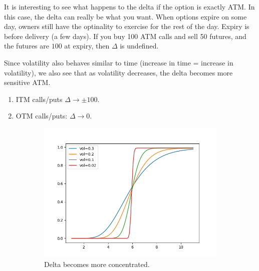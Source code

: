\documentclass{article}
\begin{document}
    It is interesting to see what happens to the delta if the option is exactly ATM. In this case, the delta can really be what you want. When options expire on some day, owners still have the optinality to exercise for the rest of the day. Expiry is before delivery (a few days). If you buy 100 ATM calls and sell 50 futures, and the futures are $100$ at expiry, then $\Delta$ is undefined.

    \begin{theorem}
      Since volatility also behaves similar to time (increase in time = increase in volatility), we also see that as volatility decreases, the delta becomes more sensitive ATM.  
      \begin{enumerate}
        \item ITM calls/puts $\Delta \rightarrow \pm 100$. 
        \item OTM calls/puts: $\Delta \rightarrow 0$. 
      \end{enumerate}
      \begin{figure}[H]
        \centering
        \begin{subfigure}[b]{0.48\textwidth}
        \centering
          \includegraphics[width=\textwidth]{img/delta_call_wrt_vol.png}
          \caption{Delta becomes more concentrated. }
          \label{fig:delta_call_wrt_vol}
        \end{subfigure}
        \hfill 
        \begin{subfigure}[b]{0.48\textwidth}
        \centering

\end{subfigure}
\end{figure}
\end{theorem}
\end{document}
